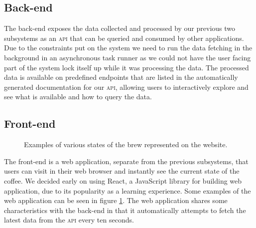 \documentclass[12pt,a4paper,oneside,article]{memoir}
\numberwithin{equation}{chapter}
\begin{document}
\subsection{Back-end}\label{sec:back-end}
The back-end exposes the data collected and processed by our previous two
subsystems as an \textsc{api} that can be queried and consumed by other
applications. Due to the constraints put on the system we need to run the data
fetching in the background in an asynchronous task runner as we could not have
the user facing part of the system lock itself up while it was processing the
data. The processed data is available on predefined endpoints that are listed in
the automatically generated documentation for our \textsc{api}, allowing users
to interactively explore and see what is available and how to query the data.

\subsection{Front-end}\label{sec:front-end}
\begin{figure}[ht]
  \centerfloat{}
  \caption{Examples of various states of the brew represented on the website.}\label{fig:website}
\end{figure}
The front-end is a web application, separate from the previous subsystems, that
users can visit in their web browser and instantly see the current state of the
coffee. We decided early on using React, a JavaScript library for building web
application, due to its popularity as a learning experience. Some examples of
the web application can be seen in figure \ref{fig:website}. The web application
shares some characteristics with the back-end in that it automatically attempts
to fetch the latest data from the \textsc{api} every ten seconds.
\end{document}
